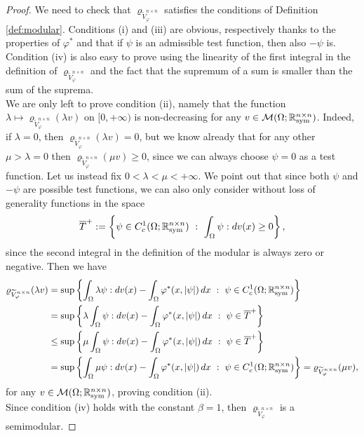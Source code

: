 \documentclass[a4paper,11pt,oneside,notitlepage]{article}
\numberwithin{equation}{section}
\def\R{\mathbb{R}}
\def\M{\mathcal{M}}
\def\sym{{\rm sym}}
\newcommand{\vphi}{\varphi}
\newcommand{\vrho}{\varrho}
\newcommand{\st}{ \ : \ }
\begin{document}
\begin{proof}
    We need to check that $\vrho_{\widetilde{V}^{n \times n}_\vphi}$ satisfies the conditions of Definition \ref{def:modular}. Conditions (i) and (iii) are obvious, respectively thanks to the properties of $\vphi^*$ and that if $\psi$ is an admissible test function, then also $-\psi$ is. Condition (iv) is also easy to prove using the linearity of the first integral in the definition of $\vrho_{\widetilde{V}^{n \times n}_\vphi}$ and the fact that the supremum of a sum is smaller than the sum of the suprema.
    \\
    We are only left to prove condition (ii), namely that the function $\lambda \mapsto \vrho_{\widetilde{V}^{n \times n}_\vphi}(\lambda v)$ on $[0, +\infty)$ is non-decreasing for any $v \in \M(\Omega; \R^{n \times n}_\sym)$. Indeed, if $\lambda = 0$, then $\vrho_{\widetilde{V}^{n \times n}_\vphi}(\lambda v) = 0$, but we know already that for any other $\mu > \lambda = 0$ then $\vrho_{\widetilde{V}^{n \times n}_\vphi}(\mu v) \ge 0$, since we can always choose $\psi = 0$ as a test function. Let us instead fix $0 < \lambda < \mu < +\infty$. We point out that since both $\psi$ and $-\psi$ are possible test functions, we can also only consider without loss of generality functions in the space
    \begin{equation*}
        \overline{T}^+ := \left\{ \psi \in C^1_c(\Omega; \R^{n \times n}_\sym) \st \int_\Omega \psi : dv(x) \ge 0 \right\},
    \end{equation*}
    since the second integral in the definition of the modular is always zero or negative. Then we have
    \begin{equation*}
    \begin{aligned}
        \vrho_{\widetilde{V}^{n \times n}_\vphi}(\lambda v)
        &= \sup \left\{ \int_\Omega \lambda\psi : dv(x) - \int_\Omega\vphi^*(x,|\psi|) \, dx \st \psi \in C^1_c(\Omega; \R^{n \times n}_\sym) \right\} \\
        &= \sup \left\{ \lambda \int_\Omega \psi : dv(x) - \int_\Omega\vphi^*(x,|\psi|) \, dx \st \psi \in \overline{T}^+ \right\} \\
        &\le \sup \left\{ \mu \int_\Omega \psi : dv(x) - \int_\Omega\vphi^*(x,|\psi|) \, dx \st \psi \in \overline{T}^+ \right\} \\
        &= \sup \left\{\int_\Omega \mu\psi : dv(x) - \int_\Omega\vphi^*(x,|\psi|) \, dx \st \psi \in C^1_c(\Omega; \R^{n \times n}_\sym) \right\} = \vrho_{\widetilde{V}^{n \times n}_\vphi}(\mu v),
    \end{aligned}
    \end{equation*}
    for any $v \in \M(\Omega; \R^{n \times n}_\sym)$, proving condition (ii).
    \\
    Since condition (iv) holds with the constant $\beta = 1$, then $\vrho_{\widetilde{V}^{n \times n}_\vphi}$ is a semimodular.
\end{proof}
\end{document}
